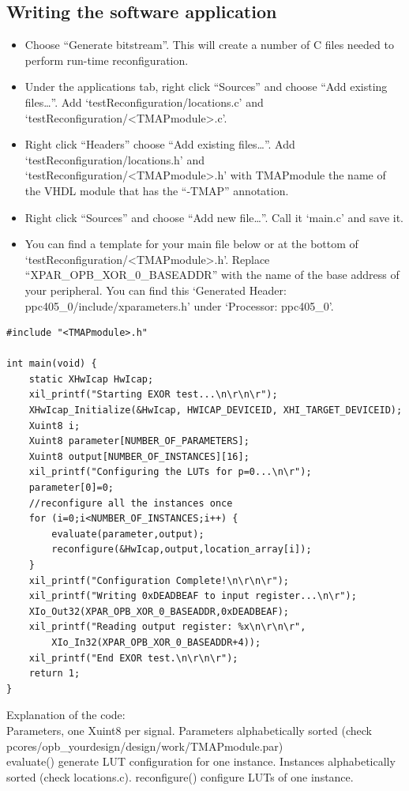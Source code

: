 \documentclass[a4paper,oneside]{memoir}
\begin{document}
\subsection{Writing the software application}
\begin{itemize}
\item Choose ``Generate bitstream''. This will create a number of C files needed to perform run-time reconfiguration.
\item Under the applications tab, right click ``Sources'' and choose ``Add existing files\dots''. Add `testReconfiguration/locations.c' and `testReconfiguration/<TMAPmodule>.c'.
\item Right click ``Headers'' choose ``Add existing files\dots''. Add `testReconfiguration/locations.h' and `testReconfiguration/<TMAPmodule>.h' with TMAPmodule the name of the VHDL module that has the ``-\-TMAP'' annotation.
\item Right click ``Sources'' and choose ``Add new file\dots''. Call it `main.c' and save it.
\item You can find a template for your main file below or at the bottom of `testReconfiguration/<TMAPmodule>.h'. Replace ``XPAR\_OPB\_XOR\_0\_BASEADDR'' with the name of the base address of your peripheral. You can find this `Generated Header: ppc405\_0/include/xparameters.h' under  `Processor: ppc405\_0'.
\end{itemize}

\begin{lstlisting}
#include "<TMAPmodule>.h"

int main(void) {
	static XHwIcap HwIcap;
	xil_printf("Starting EXOR test...\n\r\n\r");
	XHwIcap_Initialize(&HwIcap, HWICAP_DEVICEID, XHI_TARGET_DEVICEID);
	Xuint8 i;
	Xuint8 parameter[NUMBER_OF_PARAMETERS];
	Xuint8 output[NUMBER_OF_INSTANCES][16];
	xil_printf("Configuring the LUTs for p=0...\n\r");
	parameter[0]=0;
	//reconfigure all the instances once
	for (i=0;i<NUMBER_OF_INSTANCES;i++) {
		evaluate(parameter,output);
		reconfigure(&HwIcap,output,location_array[i]);
	}
	xil_printf("Configuration Complete!\n\r\n\r");
	xil_printf("Writing 0xDEADBEAF to input register...\n\r");
	XIo_Out32(XPAR_OPB_XOR_0_BASEADDR,0xDEADBEAF);
	xil_printf("Reading output register: %x\n\r\n\r", 
		XIo_In32(XPAR_OPB_XOR_0_BASEADDR+4));
	xil_printf("End EXOR test.\n\r\n\r");
	return 1;
}
\end{lstlisting}

Explanation of the code:\\
Parameters, one Xuint8 per signal. Parameters alphabetically sorted (check pcores/opb\_yourdesign/design/work/TMAPmodule.par)\\
evaluate() generate LUT configuration for one instance. Instances alphabetically sorted (check locations.c).
reconfigure() configure LUTs of one instance.
\end{document}
